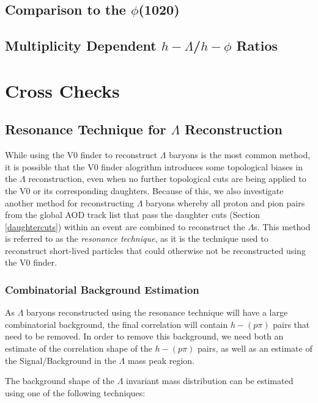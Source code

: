 \documentclass[ALICE,manyauthors]{ALICE_analysis_notes}
\begin{document}
\subsection{Comparison to the $\phi$(1020)}
\subsection{Multiplicity Dependent $h-\Lambda$/$h-\phi$ Ratios}



\clearpage
\section{Cross Checks}
\subsection{Resonance Technique for $\Lambda$ Reconstruction}
\label{resonance_technique}

While using the V0 finder to reconstruct $\Lambda$ baryons is the most common method, it is possible that the V0 finder alogrithm introduces some topological biases in the $\Lambda$ reconstruction, even when no further topological cuts are being applied to the V0 or its corresponding daughters. Because of this, we also investigate another method for reconstructing $\Lambda$ baryons whereby all proton and pion pairs from the global AOD track list that pass the daughter cuts (Section \ref{daughtercuts}) within an event are combined to reconstruct the $\Lambda$s. This method is referred to as the \textit{resonance technique}, as it is the technique used to reconstruct short-lived particles that could otherwise not be reconstructed using the V0 finder.

\subsubsection{Combinatorial Background Estimation}
\label{combinatorial_background}

As $\Lambda$ baryons reconstructed using the resonance technique will have a large combinatorial background, the final correlation will contain $h-(p\pi)$ pairs that need to be removed. In order to remove this background, we need both an estimate of the correlation shape of the $h-(p\pi)$ pairs, as well as an estimate of the Signal/Background in the $\Lambda$ mass peak region.

 The background shape of the $\Lambda$ invariant mass distribution can be estimated using one of the following techniques:
\end{document}
